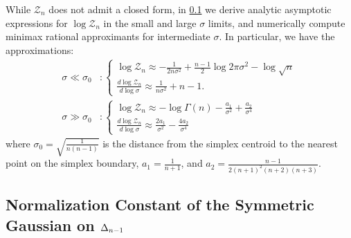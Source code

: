 While $\mathcal{Z}_n$ does not admit a closed form, in \cref{sec:supp:gauss_distbn_norm} we derive analytic asymptotic expressions for $\log\mathcal{Z}_n$ in the small and large $\sigma$ limits, and numerically compute minimax rational approximants for intermediate $\sigma$.
In particular, we have the approximations:
\begin{align}
    \sigma \ll \sigma_0 & :
    \begin{cases}
        \log\mathcal{Z}_n                                          \approx -\frac{1}{2 n \sigma^2} + \frac{n-1}{2} \log 2\pi\sigma^2 - \log\sqrt{n} \\
        \frac{d \log\mathcal{Z}_n}{d \log\sigma} \approx \frac{1}{n \sigma^2} + n - 1.
    \end{cases}
    \\
    \sigma \gg \sigma_0 & :
    \begin{cases}
        \log\mathcal{Z}_n                                          \approx -\log\Gamma(n) - \frac{a_1}{\sigma^2} + \frac{a_2}{\sigma^4} \\
        \frac{d \log\mathcal{Z}_n}{d \log\sigma} \approx \frac{2 a_1}{\sigma^2} - \frac{4 a_2}{\sigma^4}
    \end{cases}
\end{align}
where $\sigma_0 = \sqrt{\frac{1}{n (n-1)}}$ is the distance from the simplex centroid to the nearest point on the simplex boundary, $a_1 = \frac{1}{n+1}$, and $a_2 = \frac{n-1}{2 (n+1)^2 (n+2) (n+3)}$.

\subsection{Normalization Constant of the Symmetric Gaussian on \texorpdfstring{$\Delta_{n-1}$}{DeltaNMinusOne}}\label{sec:supp:gauss_distbn_norm}

